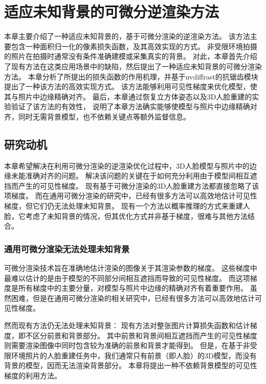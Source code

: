 \chapter{适应未知背景的可微分逆渲染方法}
\label{chap:method}

本章主要介绍了一种适应未知背景的，基于可微分渲染的逆渲染方法。
该方法主要包含一种面积归一化的像素损失函数，及其高效实现的方式。
非受限环境拍摄的照片在拍摄时通常没有条件准确建模或采集真实的背景。
对此，本章首先介绍了现有方法在这类应用场景中的缺陷，然后提出了一种适应未知背景的可微分渲染方法。
本章分析了所提出的损失函数的作用机理，并基于nvdiffrast的抗锯齿模块提出了一种该方法的高效实现方式。
该方法能够利用可见性梯度来优化模型，使其与照片中边缘精确对齐。
最后，本章通过恢复立方体姿态以及3D人脸重建的实验验证了该方法的有效性，
说明了本章方法确实能够使模型与照片中边缘精确对齐，同时无需背景模型，也不依赖关键点等额外监督信息。

\section{研究动机}

本章希望解决在利用可微分渲染的逆渲染优化过程中，3D人脸模型与照片中的边缘未能准确对齐的问题。
解决该问题的关键在于如何充分利用由于模型间相互遮挡而产生的可见性梯度。
现有基于可微分渲染的3D人脸重建方法都直接忽略了该项梯度。
而在通用可微分渲染的研究中，已经有很多方法可以高效地估计可见性梯度，但它们仍无法处理未知背景。
现有一个方法\citep{SchonbornEFV15}以概率推理的方式来重建人脸，它考虑了未知背景的情况，但其优化方式并非基于梯度，很难与其他方法结合。

\subsection{通用可微分渲染无法处理未知背景}

可微分渲染技术旨在准确地估计渲染的图像关于其渲染参数的梯度。
这些梯度中最难以估计的是由于模型的不同部分间相互遮挡而导致的可见性梯度。
而这项梯度是所有梯度中的主要分量，对模型与照片中边缘的精确对齐有着重要作用。
虽然困难，但是在通用可微分渲染的相关研究中，已经有很多方法可以高效地估计可见性梯度。

然而现有方法仍无法处理未知背景：
现有方法对整张图片计算损失函数和估计梯度，即不区分前景和背景部分。
其中前景和背景间相互遮挡而产生的可见性梯度则需要渲染图像中同时包含较为准确的前景和背景才能得到。
但是，在基于非受限环境照片的人脸重建任务中，我们通常只有前景（即人脸）的3D模型，而没有背景的模型，因而无法渲染背景部分。
本章将提出一种不依赖背景模型的可见性梯度的利用方法。

